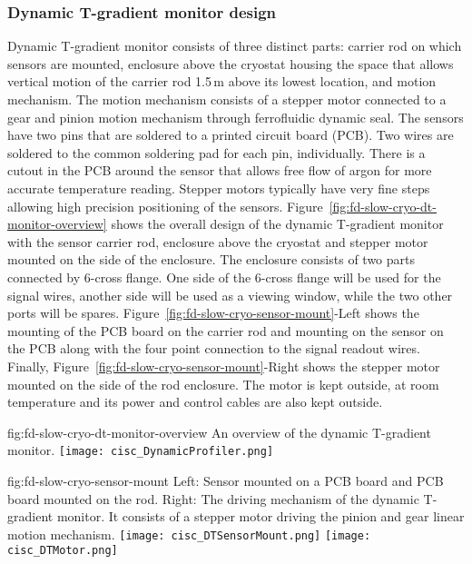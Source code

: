 
\subsubsection{Dynamic T-gradient monitor design}
Dynamic T-gradient monitor consists of three distinct parts: carrier rod on which sensors are mounted, enclosure above the cryostat housing the space that allows vertical motion of the carrier rod 1.5\,m above its lowest location, and motion mechanism. The motion mechanism consists of a stepper motor connected to a gear and pinion motion mechanism through ferrofluidic dynamic seal. The sensors have two pins that are soldered to a printed circuit board (PCB). Two wires are soldered to the common soldering pad for each pin, individually.   There is a cutout in the PCB around the sensor that allows free flow of argon for more accurate temperature reading.  Stepper motors typically have very fine steps allowing high precision positioning of the sensors.  Figure~\ref{fig:fd-slow-cryo-dt-monitor-overview} shows the overall design of the dynamic T-gradient monitor with the sensor carrier rod, enclosure above the cryostat and stepper motor mounted on the side of the enclosure. The enclosure consists of two parts connected by 6-cross flange. One side of the 6-cross flange will be used for the signal wires, another side will be used as a viewing window, while the two other ports will be spares. Figure~\ref{fig:fd-slow-cryo-sensor-mount}-Left shows the mounting of the PCB board on the carrier rod and mounting on the sensor on the PCB along with the four point connection to the signal readout wires. Finally, Figure~\ref{fig:fd-slow-cryo-sensor-mount}-Right shows the stepper motor mounted on the side of the rod enclosure. The motor is kept outside, at room temperature and its power and control cables are also kept outside.

\begin{dunefigure}{fig:fd-slow-cryo-dt-monitor-overview}
  {An overview of the dynamic T-gradient monitor.}
 \texttt{[image: cisc\_DynamicProfiler.png]}
\end{dunefigure}
\begin{dunefigure}{fig:fd-slow-cryo-sensor-mount}
  {Left: Sensor mounted on a PCB board and PCB board mounted on the rod. Right:
    The driving mechanism of the dynamic T-gradient monitor. It consists of a stepper motor driving the pinion and gear linear motion mechanism. }
  \texttt{[image: cisc\_DTSensorMount.png]}
  \hspace{3cm}%
  \texttt{[image: cisc\_DTMotor.png]}
\end{dunefigure}


